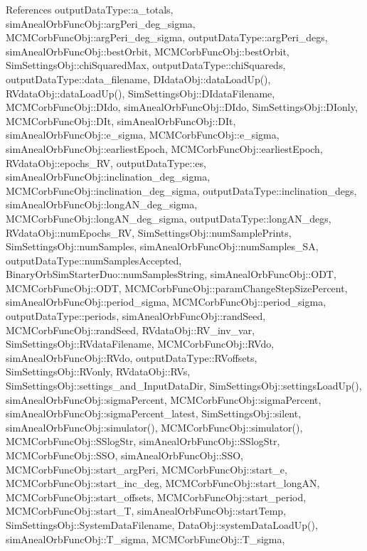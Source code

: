 References output\-Data\-Type\-::a\-\_\-totals, sim\-Aneal\-Orb\-Func\-Obj\-::arg\-Peri\-\_\-deg\-\_\-sigma, M\-C\-M\-Corb\-Func\-Obj\-::arg\-Peri\-\_\-deg\-\_\-sigma, output\-Data\-Type\-::arg\-Peri\-\_\-degs, sim\-Aneal\-Orb\-Func\-Obj\-::best\-Orbit, M\-C\-M\-Corb\-Func\-Obj\-::best\-Orbit, Sim\-Settings\-Obj\-::chi\-Squared\-Max, output\-Data\-Type\-::chi\-Squareds, output\-Data\-Type\-::data\-\_\-filename, D\-Idata\-Obj\-::data\-Load\-Up(), R\-Vdata\-Obj\-::data\-Load\-Up(), Sim\-Settings\-Obj\-::\-D\-Idata\-Filename, M\-C\-M\-Corb\-Func\-Obj\-::\-D\-Ido, sim\-Aneal\-Orb\-Func\-Obj\-::\-D\-Ido, Sim\-Settings\-Obj\-::\-D\-Ionly, M\-C\-M\-Corb\-Func\-Obj\-::\-D\-It, sim\-Aneal\-Orb\-Func\-Obj\-::\-D\-It, sim\-Aneal\-Orb\-Func\-Obj\-::e\-\_\-sigma, M\-C\-M\-Corb\-Func\-Obj\-::e\-\_\-sigma, sim\-Aneal\-Orb\-Func\-Obj\-::earliest\-Epoch, M\-C\-M\-Corb\-Func\-Obj\-::earliest\-Epoch, R\-Vdata\-Obj\-::epochs\-\_\-\-R\-V, output\-Data\-Type\-::es, sim\-Aneal\-Orb\-Func\-Obj\-::inclination\-\_\-deg\-\_\-sigma, M\-C\-M\-Corb\-Func\-Obj\-::inclination\-\_\-deg\-\_\-sigma, output\-Data\-Type\-::inclination\-\_\-degs, sim\-Aneal\-Orb\-Func\-Obj\-::long\-A\-N\-\_\-deg\-\_\-sigma, M\-C\-M\-Corb\-Func\-Obj\-::long\-A\-N\-\_\-deg\-\_\-sigma, output\-Data\-Type\-::long\-A\-N\-\_\-degs, R\-Vdata\-Obj\-::num\-Epochs\-\_\-\-R\-V, Sim\-Settings\-Obj\-::num\-Sample\-Prints, Sim\-Settings\-Obj\-::num\-Samples, sim\-Aneal\-Orb\-Func\-Obj\-::num\-Samples\-\_\-\-S\-A, output\-Data\-Type\-::num\-Samples\-Accepted, Binary\-Orb\-Sim\-Starter\-Duo\-::num\-Samples\-String, sim\-Aneal\-Orb\-Func\-Obj\-::\-O\-D\-T, M\-C\-M\-Corb\-Func\-Obj\-::\-O\-D\-T, M\-C\-M\-Corb\-Func\-Obj\-::param\-Change\-Step\-Size\-Percent, sim\-Aneal\-Orb\-Func\-Obj\-::period\-\_\-sigma, M\-C\-M\-Corb\-Func\-Obj\-::period\-\_\-sigma, output\-Data\-Type\-::periods, sim\-Aneal\-Orb\-Func\-Obj\-::rand\-Seed, M\-C\-M\-Corb\-Func\-Obj\-::rand\-Seed, R\-Vdata\-Obj\-::\-R\-V\-\_\-inv\-\_\-var, Sim\-Settings\-Obj\-::\-R\-Vdata\-Filename, M\-C\-M\-Corb\-Func\-Obj\-::\-R\-Vdo, sim\-Aneal\-Orb\-Func\-Obj\-::\-R\-Vdo, output\-Data\-Type\-::\-R\-Voffsets, Sim\-Settings\-Obj\-::\-R\-Vonly, R\-Vdata\-Obj\-::\-R\-Vs, Sim\-Settings\-Obj\-::settings\-\_\-and\-\_\-\-Input\-Data\-Dir, Sim\-Settings\-Obj\-::settings\-Load\-Up(), sim\-Aneal\-Orb\-Func\-Obj\-::sigma\-Percent, M\-C\-M\-Corb\-Func\-Obj\-::sigma\-Percent, sim\-Aneal\-Orb\-Func\-Obj\-::sigma\-Percent\-\_\-latest, Sim\-Settings\-Obj\-::silent, sim\-Aneal\-Orb\-Func\-Obj\-::simulator(), M\-C\-M\-Corb\-Func\-Obj\-::simulator(), M\-C\-M\-Corb\-Func\-Obj\-::\-S\-Slog\-Str, sim\-Aneal\-Orb\-Func\-Obj\-::\-S\-Slog\-Str, M\-C\-M\-Corb\-Func\-Obj\-::\-S\-S\-O, sim\-Aneal\-Orb\-Func\-Obj\-::\-S\-S\-O, M\-C\-M\-Corb\-Func\-Obj\-::start\-\_\-arg\-Peri, M\-C\-M\-Corb\-Func\-Obj\-::start\-\_\-e, M\-C\-M\-Corb\-Func\-Obj\-::start\-\_\-inc\-\_\-deg, M\-C\-M\-Corb\-Func\-Obj\-::start\-\_\-long\-A\-N, M\-C\-M\-Corb\-Func\-Obj\-::start\-\_\-offsets, M\-C\-M\-Corb\-Func\-Obj\-::start\-\_\-period, M\-C\-M\-Corb\-Func\-Obj\-::start\-\_\-\-T, sim\-Aneal\-Orb\-Func\-Obj\-::start\-Temp, Sim\-Settings\-Obj\-::\-System\-Data\-Filename, Data\-Obj\-::system\-Data\-Load\-Up(), sim\-Aneal\-Orb\-Func\-Obj\-::\-T\-\_\-sigma, M\-C\-M\-Corb\-Func\-Obj\-::\-T\-\_\-sigma, 